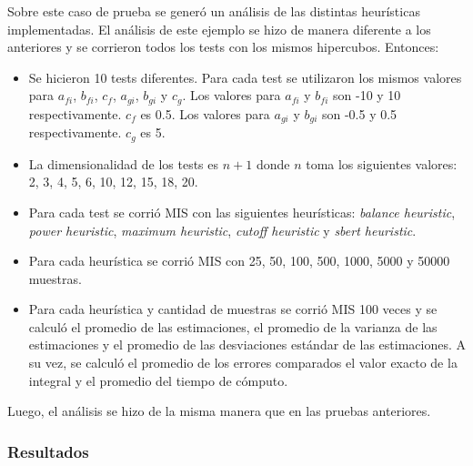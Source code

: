 \documentclass{article}
\begin{document}
Sobre este caso de prueba se generó un análisis de las distintas heurísticas implementadas.
El análisis de este ejemplo se hizo de manera diferente a los anteriores y se corrieron todos los tests con los mismos hipercubos.
Entonces:
\begin{itemize}
\item Se hicieron 10 tests diferentes. Para cada test se utilizaron los mismos valores para \( a_{fi} \), \( b_{fi} \), \( c_f \), \( a_{gi} \), \( b_{gi} \) y \( c_g \).
      Los valores para \( a_{fi} \) y \( b_{fi} \) son -10 y 10 respectivamente. \( c_f \) es 0.5.
      Los valores para \( a_{gi} \) y \( b_{gi} \) son -0.5 y 0.5 respectivamente. \( c_g \) es 5.
\item La dimensionalidad de los tests es \( n + 1 \) donde \( n \) toma los siguientes valores: 2, 3, 4, 5, 6, 10, 12, 15, 18, 20.
\item Para cada test se corrió MIS con las siguientes heurísticas: \textit{balance heuristic}, \textit{power heuristic}, \textit{maximum heuristic}, \textit{cutoff heuristic} y \textit{sbert heuristic}.
\item Para cada heurística se corrió MIS con 25, 50, 100, 500, 1000, 5000 y 50000 muestras.
\item Para cada heurística y cantidad de muestras se corrió MIS 100 veces y se calculó el promedio de las estimaciones,
      el promedio de la varianza de las estimaciones y el promedio de las desviaciones estándar de las estimaciones.
      A su vez, se calculó el promedio de los errores comparados el valor exacto de la integral y el promedio del tiempo de cómputo.
\end{itemize}

Luego, el análisis se hizo de la misma manera que en las pruebas anteriores.

\subsubsection{Resultados}
\end{document}
